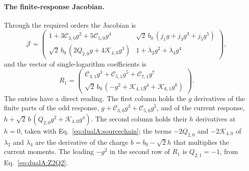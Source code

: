 \documentclass[11pt,a4paper]{article}
\numberwithin{equation}{section}
\begin{document}
\paragraph{The finite-response Jacobian.} Through the required orders the Jacobian is
\begin{equation}
 \mathcal J=\begin{pmatrix}
 1+3\mathcal C_{3,0}g^2+5\mathcal C_{5,0}g^4 & \sqrt2\,b_0\,(j_1g+j_3g^3+j_5g^5)\\[2pt]
 \sqrt2\,b_0\,(2Q_{2,0}g+4\mathcal K_{4,0}g^3) & 1+\lambda_2g^2+\lambda_4g^4
 \end{pmatrix},
 \label{eq:dualA:jacobianmatrix}
\end{equation}
and the vector of single-logarithm coefficients is
\begin{equation}
 R_1=\begin{pmatrix}
 \mathcal C_{3,1}g^3+\mathcal C_{5,1}g^5+\mathcal C_{7,1}g^7\\[2pt]
 \sqrt2\,b_0\,(-g^2+\mathcal K_{4,1}g^4+\mathcal K_{6,1}g^6)
 \end{pmatrix}.
 \label{eq:dualA:R1}
\end{equation}
The entries have a direct reading. The first column holds the $g$ derivatives of the finite parts of the odd
response, $g+\mathcal C_{3,0}g^3+\mathcal C_{5,0}g^5$, and of the current response,
$h+\sqrt2\,b\,(Q_{2,0}g^2+\mathcal K_{4,0}g^4)$. The second column holds their $h$ derivatives at $h=0$, taken with
Eq.~\eqref{eq:dualA:sourcechain}; the terms $-2Q_{2,0}$ and $-2\mathcal K_{4,0}$ of $\lambda_2$ and $\lambda_4$ are the
derivative of the charge $b=b_0-\sqrt2h$ that multiplies the current moments. The leading $-g^2$ in the second row of
$R_1$ is $Q_{2,1}=-1$, from Eq.~\eqref{eq:dualA:Z2Q2}.
\end{document}
